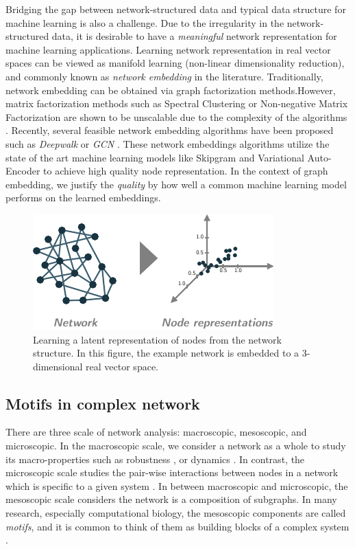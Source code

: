 \documentclass{article}
\theoremstyle{definition}
\begin{document}
Bridging the gap between network-structured data and typical
data structure for machine learning is also a challenge. 
Due to the irregularity in the network-structured data, 
it is desirable to have a \emph{meaningful}
network representation for machine learning applications. 
Learning network representation in real vector spaces can be
viewed as manifold learning (non-linear dimensionality reduction),
and commonly known as \emph{network embedding} in the literature.  
Traditionally, network embedding can be obtained via graph 
factorization methods.However, matrix factorization methods such as
Spectral Clustering or Non-negative Matrix Factorization are 
shown to be unscalable due to the complexity of the algorithms 
\cite{deepwalk,eigmaps}. Recently, several feasible network
embedding algorithms have been proposed such as \emph{Deepwalk}
\cite{deepwalk} or \emph{GCN} \cite{gcn}. These network embeddings 
algorithms utilize the state of the art machine learning models like
Skipgram \cite{Skipgram} and Variational Auto-Encoder \cite{varauto}
to achieve high quality node representation. In the context of graph
embedding, we justify the \emph{quality} by how well a common
machine learning model performs on the learned embeddings.

\begin{figure} \label{fig:cartoon}
    \centering
    \includegraphics[width=0.8\linewidth]{cartoon_emb}
    \caption{Learning a latent representation of nodes from the network structure. In this figure, the example network is embedded to a 3-dimensional real vector space.}
\end{figure}

\subsection{Motifs in complex network}

There are three scale of network analysis: macroscopic, mesoscopic, 
and microscopic. In the macroscopic scale, we consider a network as a 
whole to study its macro-properties such as robustness 
\cite{callaway2000network}, or dynamics \cite{barabasi2014network}.
In contrast, the microscopic scale studies the pair-wise interactions
between nodes in a network which is specific to a given system 
\cite{physicnet}. In between macroscopic and microscopic, the mesoscopic 
scale considers the network is a composition of subgraphs. 
In many research, especially computational biology, the
mesoscopic components are called \emph{motifs}, and it is common
to think of them as building blocks of a complex system 
\cite{motifblockmilo}.
\end{document}
